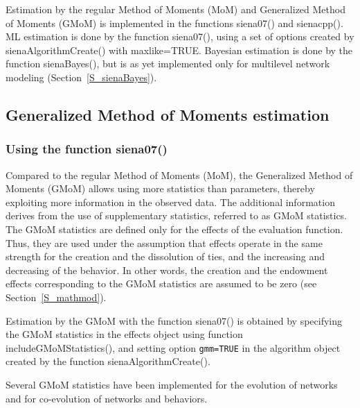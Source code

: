 \documentclass[a4paper,fleqn,11pt]{article}
\newcommand{\+}{\, + \,}
\newcommand{\sfn}[1]{\textsf{#1}}
\begin{document}
Estimation by the regular Method of Moments (MoM)
and Generalized Method of Moments (GMoM)
is implemented in the functions \sfn{siena07()} and \sfn{sienacpp()}.
ML estimation is done by the function \sfn{siena07()}, using a set of options
created by \sfn{sienaAlgorithmCreate()} with \sfn{maxlike=TRUE}.
Bayesian estimation is done by the function \sfn{sienaBayes()},
but is as yet implemented only for multilevel network modeling
(Section~\ref{S_sienaBayes}).


\subsection{Generalized Method of Moments estimation}
\label{S_GMoM}

\subsubsection{Using the function \sfn{siena07()}}
\label{S_GMoM_siena07}


Compared to the regular Method of Moments (MoM), the Generalized Method of
Moments (GMoM) allows using more statistics than parameters,
thereby exploiting more information in the observed data.
The additional information derives from the use of supplementary statistics,
referred to as GMoM statistics. The GMoM statistics are defined only for the effects
of the evaluation function. Thus, they are used under the assumption that
effects operate in the same strength for the creation and the dissolution of ties,
and the increasing and decreasing of the behavior. In other words,
the creation and the endowment effects
corresponding to the GMoM statistics are assumed to be zero
(see Section~\ref{S_mathmod}).
\medskip

Estimation by the GMoM with the function \sfn{siena07()} is obtained
by specifying the GMoM statistics in the effects object using
function \sfn{includeGMoMStatistics()},
and setting option \texttt{gmm=TRUE}
in the algorithm object created by the function \sfn{sienaAlgorithmCreate()}.

Several GMoM statistics have been implemented for the evolution of networks
and for co-evolution of networks and behaviors.
\end{document}
